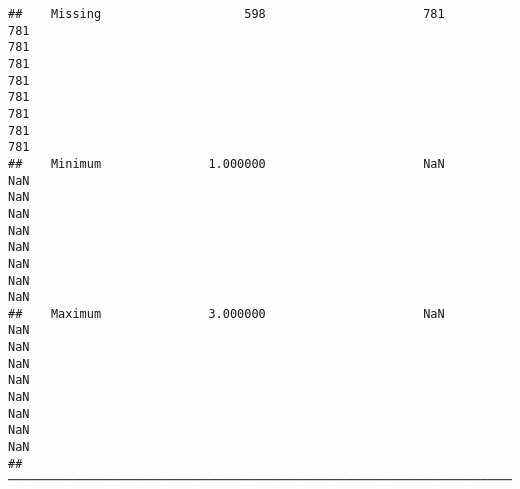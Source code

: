 \documentclass[
]{article}
\begin{document}
\begin{verbatim}
##    Missing                    598                      781                                                                  781                                                                  781                                                                  781                                                                  781                                                                  781                                                                  781                                                                  781                                                                  781   
##    Minimum               1.000000                      NaN                                                                  NaN                                                                  NaN                                                                  NaN                                                                  NaN                                                                  NaN                                                                  NaN                                                                  NaN                                                                  NaN   
##    Maximum               3.000000                      NaN                                                                  NaN                                                                  NaN                                                                  NaN                                                                  NaN                                                                  NaN                                                                  NaN                                                                  NaN                                                                  NaN   
##  ───────────────────────────────────────────────────────────────────────────────────────────────────────────────────────────────────────────────────────────────────────────────────────────────────────────────────────────────────────────────────────────────────────────────────────────────────────────────────────────────────────────────────────────────────────────────────────────────────────────────────────────────────────────────────────────────────────────────────────────────────────────────────────────────────────────────────────────────────────────────────────────────────────────────────────────────────
\end{verbatim}
\end{document}
